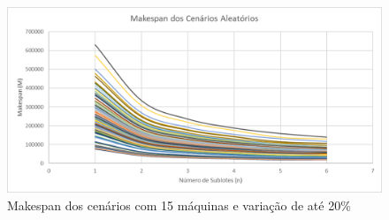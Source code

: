 \begin{figure}[!ht]
    \centering
    \includegraphics[width=12cm]{Resultados/Figuras/M15_20}
    \caption{Makespan dos cenários com 15 máquinas e variação de até 20\%}
    \label{fig:M15_20}
\end{figure}